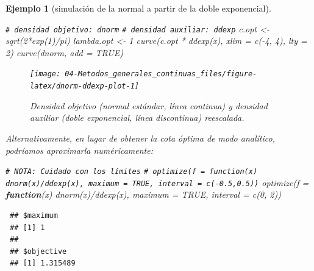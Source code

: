 \documentclass[
]{book}
\newenvironment{Shaded}{\begin{snugshade}}{\end{snugshade}}
\newcommand{\AttributeTok}[1]{\textcolor[rgb]{0.77,0.63,0.00}{#1}}
\newcommand{\CommentTok}[1]{\textcolor[rgb]{0.56,0.35,0.01}{\textit{#1}}}
\newcommand{\ConstantTok}[1]{\textcolor[rgb]{0.00,0.00,0.00}{#1}}
\newcommand{\ControlFlowTok}[1]{\textcolor[rgb]{0.13,0.29,0.53}{\textbf{#1}}}
\newcommand{\DecValTok}[1]{\textcolor[rgb]{0.00,0.00,0.81}{#1}}
\newcommand{\FunctionTok}[1]{\textcolor[rgb]{0.00,0.00,0.00}{#1}}
\newcommand{\NormalTok}[1]{#1}
\newcommand{\OtherTok}[1]{\textcolor[rgb]{0.56,0.35,0.01}{#1}}
\newcommand{\SpecialCharTok}[1]{\textcolor[rgb]{0.00,0.00,0.00}{#1}}
\theoremstyle{break}
\newtheorem{example}{Ejemplo}[chapter]
\theoremstyle{nonumberplain}
\renewcommand{\CommentTok}[1]{\textcolor[rgb]{0.41,0.41,0.41}{\texttt{#1}}}
\begin{document}
\begin{example}[simulación de la normal a partir de la doble exponencial]
\begin{Shaded}
\begin{Highlighting}[]
\CommentTok{\# densidad objetivo: dnorm}
\CommentTok{\# densidad auxiliar: ddexp}
\NormalTok{c.opt }\OtherTok{\textless{}{-}} \FunctionTok{sqrt}\NormalTok{(}\DecValTok{2}\SpecialCharTok{*}\FunctionTok{exp}\NormalTok{(}\DecValTok{1}\NormalTok{)}\SpecialCharTok{/}\NormalTok{pi)}
\NormalTok{lambda.opt }\OtherTok{\textless{}{-}} \DecValTok{1}
\FunctionTok{curve}\NormalTok{(c.opt }\SpecialCharTok{*} \FunctionTok{ddexp}\NormalTok{(x), }\AttributeTok{xlim =} \FunctionTok{c}\NormalTok{(}\SpecialCharTok{{-}}\DecValTok{4}\NormalTok{, }\DecValTok{4}\NormalTok{), }\AttributeTok{lty =} \DecValTok{2}\NormalTok{)}
\FunctionTok{curve}\NormalTok{(dnorm, }\AttributeTok{add =} \ConstantTok{TRUE}\NormalTok{)}
\end{Highlighting}
\end{Shaded}

\begin{figure}[!htb]

{\centering \texttt{[image: 04-Metodos\_generales\_continuas\_files/figure-latex/dnorm-ddexp-plot-1]} 

}

\caption{Densidad objetivo (normal estándar, línea continua) y densidad auxiliar (doble exponencial, línea discontinua) reescalada.}\label{fig:dnorm-ddexp-plot}
\end{figure}

Alternativamente, en lugar de obtener la cota óptima de modo analítico, podríamos aproximarla numéricamente:

\begin{Shaded}
\begin{Highlighting}[]
\CommentTok{\# NOTA: Cuidado con los límites}
\CommentTok{\# optimize(f = function(x) dnorm(x)/ddexp(x), maximum = TRUE, interval = c({-}0.5,0.5))}
\FunctionTok{optimize}\NormalTok{(}\AttributeTok{f =} \ControlFlowTok{function}\NormalTok{(x) }\FunctionTok{dnorm}\NormalTok{(x)}\SpecialCharTok{/}\FunctionTok{ddexp}\NormalTok{(x), }\AttributeTok{maximum =} \ConstantTok{TRUE}\NormalTok{, }\AttributeTok{interval =} \FunctionTok{c}\NormalTok{(}\DecValTok{0}\NormalTok{, }\DecValTok{2}\NormalTok{))}
\end{Highlighting}
\end{Shaded}

\begin{verbatim}
 ## $maximum
 ## [1] 1
 ## 
 ## $objective
 ## [1] 1.315489
\end{verbatim}


\end{example}
\end{document}

